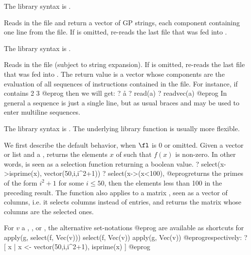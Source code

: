 {The library syntax is .

\label{se:readstr}
Reads in the file  and return a vector of GP strings,
each component containing one line from the file. If  is
omitted, re-reads the last file that was fed into .

The library syntax is .

\label{se:readvec}
Reads in the file
 (subject to string expansion). If  is
omitted, re-reads the last file that was fed into . The return
value is a vector whose components are the evaluation of all sequences
of instructions contained in the file. For instance, if  contains
2
3
@eprog\noindent
then we will get:
\bprog
? \r a
? read(a)
? readvec(a)
@eprog
In general a sequence is just a single line, but as usual braces and
\kbd{\bs} may be used to enter multiline sequences.

The library syntax is .
The underlying library function
 is usually more flexible.

\label{se:select}
We first describe the default behavior, when $\fl$ is 0 or omitted.
Given a vector or list  and a  , 
returns the elements $x$ of  such that $f(x)$ is non-zero. In other
words,  is seen as a selection function returning a boolean value.
\bprog
? select(x->isprime(x), vector(50,i,i^2+1))
? select(x->(x<100), %
@eprog\noindent returns the primes of the form $i^2+1$ for some $i\leq 50$,
then the elements less than 100 in the preceding result. The 
function also applies to a matrix , seen as a vector of columns, i.e. it
selects columns instead of entries, and returns the matrix whose columns are
the selected ones.

 For $v$ a , ,  or ,
the alternative set-notations
\bprog
[g(x) | x <- v, f(x)]
[x | x <- v, f(x)]
[g(x) | x <- v]
@eprog\noindent
are available as shortcuts for
\bprog
apply(g, select(f, Vec(v)))
select(f, Vec(v))
apply(g, Vec(v))
@eprog\noindent respectively:
\bprog
? [ x | x <- vector(50,i,i^2+1), isprime(x) ]
@eprog

}
